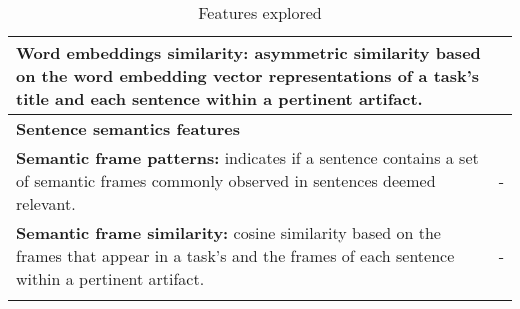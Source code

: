 \begin{table}[H]
\begin{small}
\begin{tabular}{lr}
\parbox[l][1.5cm][c]{11cm}{ 
    \textbf{Word embeddings similarity:} asymmetric similarity based on the word embedding vector representations of a task's title and each sentence within a pertinent artifact.
} & \cite{Xu2017, silva2019} \\  

\hline

\parbox[l][0.5cm][c]{11cm}{
    \textbf{Sentence semantics features}
} &  \\ 

\parbox[l][1cm][c]{11cm}{ 
    \textbf{Semantic frame patterns:} indicates if a sentence contains a set of semantic 
    frames commonly observed in sentences deemed relevant.    
} & - \\  

\parbox[l][1cm][c]{11cm}{ 
    \textbf{Semantic frame similarity:} cosine similarity based on the frames that appear 
    in a task's and the frames of each sentence within a pertinent artifact.
} & - \\  

\hline

\parbox[l][0.5cm][c]{11cm}{ 
} & \\

\end{tabular}
\end{small}
\caption{Features explored}
\label{tbl:approach-textual-features}
\end{table}

